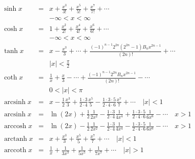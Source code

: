 \begin{eqnarray}
    \sinh x & = & x+\frac{x^3}{3!}+\frac{x^5}{5!}+\frac{x^7}{7!}+\cdots \\
    & & -\infty<x<\infty \\
    \cosh x & = & 1+\frac{x^2}{2!}+\frac{x^4}{4!}+\frac{x^6}{6!}+\cdots \\
    & & -\infty<x<\infty \\
    \tanh x & = & x-\frac{x^3}{3}+\cdots+\frac{(-1)^{n-1} 2^{2 n}\left(2^{2 n}-1\right) B_n x^{2 n-1}}{(2 n)!}+\cdots \\
    & & |x|<\frac{\pi}{2} \\
    \coth x & = & \frac{1}{x}+\frac{x}{3}-\cdots+\frac{(-1)^{n-1} 2^{2 n} B_n x^{2 n-1}}{(2 n)!}-\cdots \\
    & & 0<|x|<\pi \\
    \operatorname{arcsinh} x & = & x-\frac{1}{2} \frac{x^3}{3}+\frac{1 \cdot 3}{2 \cdot 4} \frac{x^5}{5}-\frac{1 \cdot 3 \cdot 5}{2 \cdot 4 \cdot 6} \frac{x^7}{7}+\cdots \quad |x|<1 \\
    \operatorname{arcsinh} x & = & \ln (2 x)+\frac{1}{2} \frac{1}{2 x^2}-\frac{1 \cdot 3}{2 \cdot 4} \frac{1}{4 x^4}+\frac{1 \cdot 3 \cdot 5}{2 \cdot 4 \cdot 6} \frac{1}{6 x^6}-\cdots \quad x>1 \\
    \operatorname{arccosh} x & = & \ln (2 x)-\frac{1}{2} \frac{1}{2 x^2}-\frac{1 \cdot 3}{2 \cdot 4} \frac{1}{4 x^4}-\frac{1 \cdot 3 \cdot 5}{2 \cdot 4 \cdot 6} \frac{1}{6 x^6}-\cdots \quad x>1 \\
    \operatorname{arctanh} x & = & x+\frac{x^3}{3}+\frac{x^5}{5}+\frac{x^7}{7}+\cdots \quad |x|<1 \\
    \operatorname{arccoth} x & = & \frac{1}{x}+\frac{1}{3 x^3}+\frac{1}{5 x^5}+\frac{1}{7 x^7}+\cdots \quad |x|>1 \\
\end{eqnarray}


